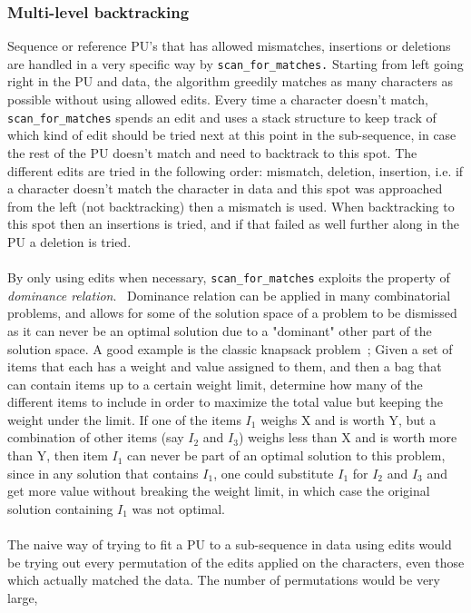 \documentclass[12pt]{article}
\newcommand{\scm}{\texttt{scan\_for\_matches} }
\newcommand{\scmp}{\texttt{scan\_for\_matches.} }
\newcommand{\pu}{PU }
\newcommand{\pus}{PU's }
\begin{document}
\subsubsection{Multi-level backtracking}
Sequence or reference \pus that has allowed mismatches, insertions or deletions are handled in a very specific way by \scmp
Starting from left going right in the \pu
and data, the algorithm greedily matches as many characters as possible without using allowed edits.
Every time a character doesn't match, \scm spends an edit and uses a stack structure to keep track of which
kind of edit should be tried next at this point in the sub-sequence, in case the rest of the \pu doesn't match and need to
backtrack to this spot. The different edits are tried in the following order: mismatch, deletion, insertion, i.e.
if a character doesn't match the character in data and this spot was approached from the left (not backtracking)
then a mismatch is used. When backtracking to this spot then an insertions is tried, and if that failed as well further along 
in the \pu a deletion is tried. \\ \\
By only using edits when necessary, \scm exploits the property of \emph{dominance relation}.~\cite{dom}
Dominance relation can be applied in many combinatorial problems, and allows for some of the solution
space of a problem to be dismissed as it can never be an optimal solution due to a "dominant" other part of the solution space. 
A good example is the classic knapsack problem~\cite{knap}; 
Given a set of items that each has a weight and value assigned to them,
and then a bag that can contain items up to a certain weight limit, determine how many of the different items to
include in order to maximize the total value but keeping the weight under the limit. If one of the items $I_1$ weighs
X and is worth Y, but a combination of other items (say $I_2$ and $I_3$) weighs less than X and is worth more than Y, 
then item $I_1$ can never be part of an optimal solution to this problem, since in any solution that contains $I_1$, 
one could substitute $I_1$ for $I_2$ and $I_3$ and get more value without breaking the weight limit, in which case the 
original solution containing $I_1$ was not optimal. \\ \\
The naive way of trying to fit a \pu to a sub-sequence in data using edits would be trying out every permutation of the edits
applied on the characters, even those which actually matched the data. The number of permutations would be very large,
\end{document}
